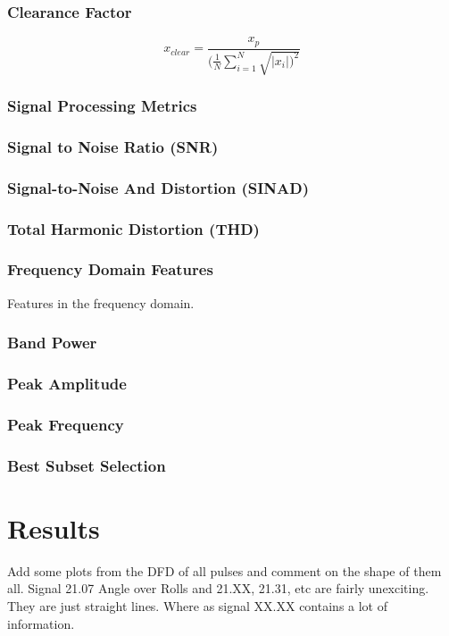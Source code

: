 \documentclass{article}
\begin{document}
\subsubsection{Clearance Factor} 
$$ x_{clear} = \frac{x_p}{(\frac{1}{N}\sum^N_{i=1}\sqrt{|x_i|)^2}} $$
  
\subsubsection{Signal Processing Metrics}
\subsubsection{Signal to Noise Ratio (SNR)} 
\subsubsection{Signal-to-Noise And Distortion (SINAD)} 
\subsubsection{Total Harmonic Distortion (THD)}   

\subsubsection{Frequency Domain Features}
Features in the frequency domain.
\subsubsection{Band Power}
\subsubsection{Peak Amplitude}
\subsubsection{Peak Frequency}
\subsubsection{Best Subset Selection}

\newpage  
\section{Results}
Add some plots from the DFD of all pulses and comment on the shape of them all.
Signal 21.07 Angle over Rolls and 21.XX, 21.31, etc are fairly unexciting. They are just straight lines.
Where as signal XX.XX contains a lot of information.
\end{document}
